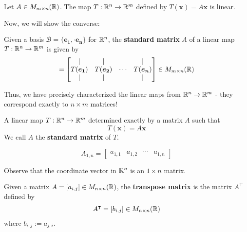 \begin{theorem}\label{thm:matrixmultislinear}
    Let $A \in M_{m \times n}(\mathbb{R})$.  The map $T : \mathbb{R}^n \to \mathbb{R}^m$ defined by $T(\bm{x}) = A\bm{x}$ is linear.
    \end{theorem}

Now, we will show the converse:

\begin{definition}
    Given a basis $\mathcal{B} = \{\bm{e_1}, \cdot \bm{e_n}\}$ for $\mathbb{R}^n$, the \textbf{standard matrix} $A$ of a linear map $T: \mathbb{R}^n \to \mathbb{R}^m$ is given by
    \begin{equation*}
[A] = 
\begin{bmatrix}
\vert & \vert & & \vert \\
    T(\bm{e_1})   & T(\bm{e_2}) & \cdots & T(\bm{e_n})  \\
    \vert & \vert & & \vert
\end{bmatrix} \in M_{m \times n}(\R)
\end{equation*}
\end{definition}

    Thus, we have precisely characterized the linear maps from $\mathbb{R}^n \to \mathbb{R}^m$ - they correspond exactly to $n \times m$ matrices!
    
    \begin{theorem}
    A linear map $T: \mathbb{R}^n \to \mathbb{R}^m$ determined exactly by a matrix $A$ such that $$T(\bm{x}) = A\bm{x}$$  
    We call $A$ the \textbf{standard matrix} of $T$.
    \end{theorem}



\begin{example}\label{coordinatematrix}
    \begin{equation*}
A_{1,n} = 
\begin{bmatrix}
a_{1,1} & a_{1,2} & \cdots & a_{1,n} 
\end{bmatrix}
\end{equation*}

Observe that the coordinate vector in $\mathbb{R}^n$ is an $1 \times n$ matrix.
    \end{example}


\begin{definition}\label{transpose}
    Given a matrix $A = [a_{i,j}] \in M_{n\times n}(\mathbb{R})$, the \textbf{transpose matrix} is the matrix $A^\intercal$ defined by $$A^\intercal = [b_{i,j}] \in M_{n\times n}(\mathbb{R})$$
    where $b_{i,j} := a_{j,i}$.
\end{definition}


